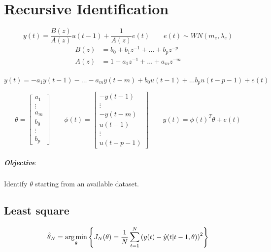 \chapter{Recursive Identification}

\begin{recall}
    \[
        y(t) = \frac{B(z)}{A(z)}u(t-1) + \frac{1}{A(z)}e(t) \qquad e(t) \sim WN(m_e, \lambda_e)
    \]
    \begin{align*}
        B(z) &= b_0 + b_1z^{-1} + \ldots + b_pz^{-p} \\
        A(z) &= 1 + a_1z^{-1} + \ldots + a_mz^{-m} \\
    \end{align*}

    \[
        y(t) = -a_1y(t-1) - \ldots - a_my(t-m) + b_0u(t-1) + \ldots b_pu(t-p-1) + e(t)
    \]

    \[
        \theta = \begin{bmatrix}
            a_1 \\ \vdots \\ a_m \\
            b_0 \\ \vdots \\ b_p
        \end{bmatrix} \qquad
        \phi(t) = \begin{bmatrix}
            -y(t-1) \\ \vdots \\ -y(t-m) \\
            u(t-1) \\ \vdots \\ u(t-p-1)
        \end{bmatrix}
        \qquad
        y(t) = \phi(t)^T\theta+e(t)
    \]

    \paragraph{Objective} Identify $\theta$ starting from an available dataset.
\end{recall}

\section{Least square}

\[
    \hat{\theta}_N = \operatorname*{arg\,min}_\theta \left\{ J_N(\theta) = \frac{1}{N} \sum_{t=1}^N \left( y(t) - \hat{y}(t|t-1, \theta) \right)^2 \right\}
\]

